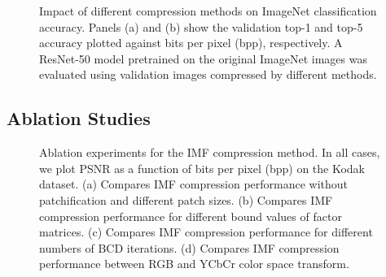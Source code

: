 \begin{figure}[t]
	\centering
	\begin{subfigure}{.5\textwidth}
		\centering
		\caption{}
		\label{fig: top1-vs-bpp imagenet}
	\end{subfigure}%
	\begin{subfigure}{.5\textwidth}
		\centering
		\caption{}
		\label{fig: top5-vs-bpp imagenet}
	\end{subfigure}
	\caption{Impact of different compression methods on ImageNet classification accuracy. Panels (a) and (b) show the validation top-1 and top-5 accuracy plotted against bits per pixel (bpp), respectively. A ResNet-50 model pretrained on the original ImageNet images was evaluated using validation images compressed by different methods.}
	
	\label{fig: compression impact on imagenet classification}
\end{figure}


\subsection{Ablation Studies} \label{sec: ablation studies}

\begin{figure}[t]
	\centering
	\begin{subfigure}{.5\textwidth}
		\centering
		\caption{}
		\label{fig: patch ablation psnr-vs-bpp}
	\end{subfigure}%
	\begin{subfigure}{.5\textwidth}
		\centering
		\caption{}
		\label{fig: bounds ablation psnr-vs-bpp}
	\end{subfigure}
	
	\begin{subfigure}{.5\textwidth}
		\centering
		\caption{}
		\label{fig: iteration ablation psnr-vs-bpp}
	\end{subfigure}%
	\begin{subfigure}{.5\textwidth}
		\centering
		\caption{}
		\label{fig: colorspace ablation psnr-vs-bpp}
	\end{subfigure}
	\caption{Ablation experiments for the IMF compression method. In all cases, we plot PSNR as a function of bits per pixel (bpp) on the Kodak dataset. (a) Compares IMF compression performance without patchification and different patch sizes. (b) Compares IMF compression performance for different bound values of factor matrices. (c) Compares IMF compression performance for different numbers of BCD iterations. (d) Compares IMF compression performance between RGB and YCbCr color space transform.}
	\label{fig: ablation studies}
\end{figure}

